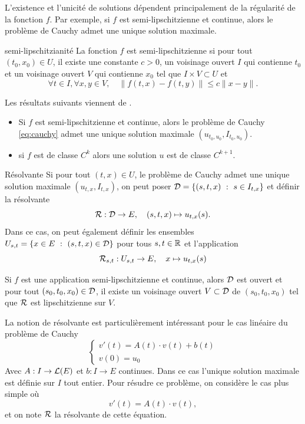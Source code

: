 L'existence et l'unicité de solutions dépendent principalement de la régularité de la fonction $f$. Par exemple,
si $f$ est semi-lipschitzienne et continue, alors le problème de Cauchy admet une unique solution maximale.

\begin{defn}{semi-lipschitzianité}{}
	La fonction $f$ est semi-lipschitzienne si pour tout $(t_0, x_0)\in U$, il existe une constante $c > 0$, un voisinage ouvert $I$ qui contienne $t_0$ et
	un voisinage ouvert $V$ qui contienne $x_0$ tel que $I \times V \subset U$ et
	\[
		\forall t \in I,\forall x,y \in V, \quad \|f(t,x) - f(t,y)\| \le c \|x-y\|.
	\]
\end{defn}

Les résultats suivants viennent de \cite{paulin}.

\begin{thm}{}{}
	\begin{itemize}
		\item Si $f$ est semi-lipschitzienne et continue, alors le problème de Cauchy \ref{eq:cauchy} admet une unique solution maximale $(u_{t_0, u_0}, I_{t_0, u_0})$.
		\item si $f$ est de classe $C^k$ alors une solution $u$ est de classe $C^{k+1}$.
	\end{itemize}
\end{thm}

\begin{defn}{Résolvante}{}
	Si pour tout $(t, x) \in U$, le problème de Cauchy admet une unique solution maximale $(u_{t,x}, I_{t,x})$, on peut poser $\mathcal{D} = \left\{(s,t,x) \ :\ s \in I_{t,x} \right\}$ et définir la résolvante
	\[
		\mathcal{R} : \mathcal{D} \to E, \quad (s,t,x) \mapsto u_{t,x}(s).
	\]
	Dans ce cas, on peut également définir les ensembles $U_{s,t} = \{x \in E \ : \ (s,t,x) \in \mathcal{D}\}$ pour tous $s,t \in \mathbb{R}$ et l'application
	\[
		\mathcal{R}_{s,t} : U_{s,t} \to E, \quad x \mapsto u_{t,x}(s)
	\]
\end{defn}

\begin{thm}{}{}
	Si $f$ est une application semi-lipschitzienne et continue, alors $\mathcal{D}$ est ouvert et pour tout $(s_0, t_0, x_0) \in \mathcal{D}$, il existe un voisinage ouvert
	$V \subset \mathcal{D}$ de $(s_0, t_0, x_0)$ tel que $\mathcal{R}$ est lipschitzienne sur $V$.
\end{thm}

La notion de résolvante est particulièrement intéressant pour le cas linéaire du problème de Cauchy
\begin{equation}
	\begin{cases}
		v'(t) = A(t) \cdot v(t) + b(t) \\
		v(0) = u_0
	\end{cases}
	\label{eq:cauchy_lin}
\end{equation}
Avec $A : I \to \mathcal{L}(E)$ et $b : I \to E$ continues. Dans ce cas l'unique solution maximale est définie sur $I$ tout entier.
Pour résudre ce problème, on considère le cas plus simple où
\[
	v'(t) = A(t) \cdot v(t),
\]
et on note $\mathcal{R}$ la résolvante de cette équation.

